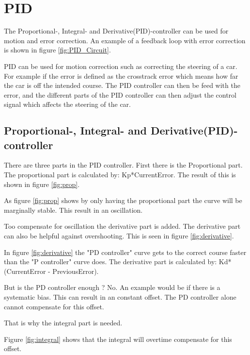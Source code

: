 \chapter{PID}
\label{chp:pid}
The Proportional-, Integral- and Derivative(PID)-controller can be used for motion and error correction. An example of a feedback loop with error correction is shown in figure \ref{fig:PID_Circuit}. 
 

PID can be used for motion correction such as correcting the steering of a car. For example if the error is defined as the crosstrack error which means how far the car is off the intended course. The PID controller can then be feed with the error, and the different parts of the PID controller can then adjust the control signal which affects the steering of the car. 


\section{Proportional-, Integral- and Derivative(PID)-controller}
There are three parts in the PID controller. First there is the Proportional part.
The proportional part is calculated by: Kp*CurrentError. The result of this is shown in figure \ref{fig:prop}.

As figure \ref{fig:prop} shows by only having the proportional part the curve will be marginally stable. This result in an oscillation.

Too compensate for oscillation the derivative part is added. The derivative part can also be helpful against overshooting. This is seen in figure \ref{fig:derivative}.


In figure \ref{fig:derivative} the "PD controller" curve gets to the correct course faster than the "P controller" curve does. The derivative part is calculated by: Kd*(CurrentError - PreviousError).

But is the PD controller enough ? No. An example would be if there is a systematic bias. This can result in an constant offset. The PD controller alone cannot compensate for this offset. 

That is why the integral part is needed. 

Figure \ref{fig:integral} shows that the integral will overtime compensate for this offset. 

